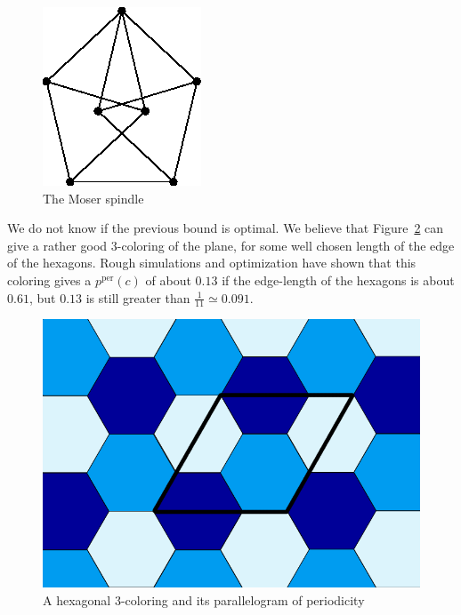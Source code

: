 \documentclass[a4paper,11pt]{article}
\theoremstyle{definition}
\theoremstyle{remark}
\newcommand{\pper}{p^{\mathrm{per}}}
\begin{document}
\begin{figure}[h]
\center
\includegraphics[scale=0.4]{T.png}
\caption{\label{color} The Moser spindle}
\end{figure}

We do not know if the previous bound is optimal. We believe that Figure~\ref{trois} 
can give a rather good $3$-coloring of the plane, for some well chosen length 
of the edge of the hexagons. Rough simulations and optimization have shown that 
this coloring gives a $\pper(c)$ of about $0.13$ if the edge-length of the hexagons is about 
$0.61$, but $0.13$ is still greater than $\frac{1}{11} \simeq 0.091$.

\begin{figure}[h]
\center
\includegraphics[scale=0.5]{trois.png}
\caption{\label{trois} A hexagonal $3$-coloring and its parallelogram of periodicity}
\end{figure}
\end{document}
